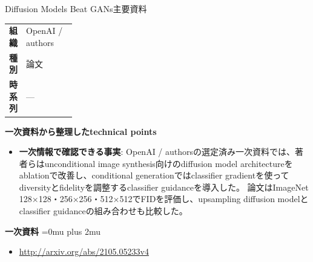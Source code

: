 \begin{technicalnote}{Diffusion Models Beat GANs}{主要資料}
\begingroup
\begin{tabularx}{\linewidth}{@{}>{\bfseries}p{0.22\linewidth}X@{}}
組織 & OpenAI / authors \\
種別 & 論文 \\
時系列 & — \\
\end{tabularx}
\smallskip
{\bfseries 一次資料から整理したtechnical points}
\begin{itemize}[leftmargin=1.5em,itemsep=0.35em]
\item \textbf{一次情報で確認できる事実}: OpenAI / authorsの選定済み一次資料では、著者らはunconditional image synthesis向けのdiffusion model architectureをablationで改善し、conditional generationではclassifier gradientを使ってdiversityとfidelityを調整するclassifier guidanceを導入した。 論文はImageNet 128×128・256×256・512×512でFIDを評価し、upsampling diffusion modelとclassifier guidanceの組み合わせも比較した。
\end{itemize}
\begin{minipage}{\linewidth}
\begin{samepage}
{\bfseries 一次資料}
\begingroup\sloppy
\Urlmuskip=0mu plus 2mu\relax
\begin{itemize}[leftmargin=1.5em,itemsep=0.25em]
\item {\scriptsize\url{http://arxiv.org/abs/2105.05233v4}}
\end{itemize}
\endgroup
\end{samepage}
\end{minipage}
\endgroup
\end{technicalnote}
\medskip

